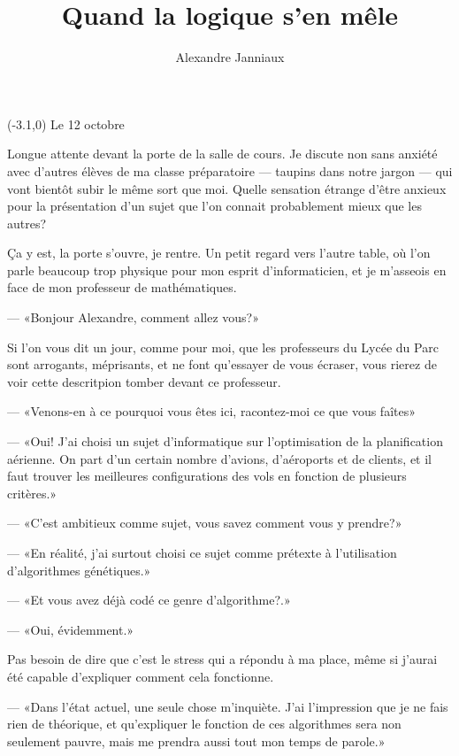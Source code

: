 \documentclass[letterpaper, 12pt]{report} %
\title{Quand la logique s'en mêle}
\author{Alexandre Janniaux}
\newcommand{\datemarge}[1]{%
    \begin{textblock}{3}(-3.1,0)
        {\color{blue}#1}
    \end{textblock}
}
\begin{document}
\doublespacing{}

  \maketitle

  
  
  { %
      \vspace{0pt}%
      \datemarge{Le 12 octobre}
Longue attente devant la porte de la salle de cours. 
Je discute non sans anxiété avec d'autres élèves de ma classe préparatoire --- taupins dans notre jargon --- qui vont bientôt subir le même sort que moi.
Quelle sensation étrange d'être anxieux pour la présentation d'un sujet que l'on connait probablement mieux que les autres?

Ça y est, la porte s'ouvre, je rentre. Un petit regard vers l'autre table, où l'on parle beaucoup trop physique pour mon esprit d'informaticien, et je m'asseois en face de mon professeur de mathématiques.

--- «Bonjour Alexandre, comment allez vous?»

Si l'on vous dit un jour, comme pour moi, que les professeurs du Lycée du Parc sont arrogants, méprisants, et ne font qu'essayer de vous écraser, vous rierez de voir cette descritpion tomber devant ce professeur.


--- «Venons-en à ce pourquoi vous êtes ici, racontez-moi ce que vous faîtes»

--- «Oui! J'ai choisi un sujet d'informatique sur l'optimisation de la planification aérienne. On part d'un certain nombre d'avions, d'aéroports et de clients, et il faut trouver les meilleures configurations des vols en fonction de plusieurs critères.»

--- «C'est ambitieux comme sujet, vous savez comment vous y prendre?» %

--- «En réalité, j'ai surtout choisi ce sujet comme prétexte à l'utilisation d'algorithmes génétiques.»

--- «Et vous avez déjà codé ce genre d'algorithme?.»

--- «Oui, évidemment.»

Pas besoin de dire que c'est le stress qui a répondu à ma place, même si j'aurai été capable d'expliquer comment cela fonctionne. 

--- «Dans l'état actuel, une seule chose m'inquiète. 
		J'ai l'impression que je ne fais rien de théorique, et qu'expliquer le fonction de ces algorithmes sera non seulement pauvre, mais me prendra aussi tout mon temps de parole.»

}
\end{document}
